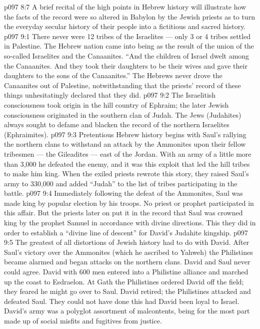\vs p097 8:7 \pc A brief recital of the high points in Hebrew history will illustrate how the facts of the record were so altered in Babylon by the Jewish priests as to turn the everyday secular history of their people into a fictitious and sacred history.
\vs p097 9:1 There never were 12 tribes of the Israelites --- only 3 or 4 tribes settled in Palestine. The Hebrew nation came into being as the result of the union of the so\hyp{}called Israelites and the Canaanites. “And the children of Israel dwelt among the Canaanites. And they took their daughters to be their wives and gave their daughters to the sons of the Canaanites.” The Hebrews never drove the Canaanites out of Palestine, notwithstanding that the priests’ record of these things unhesitatingly declared that they did.
\vs p097 9:2 The Israelitish consciousness took origin in the hill country of Ephraim; the later Jewish consciousness originated in the southern clan of Judah. The Jews (Judahites) always sought to defame and blacken the record of the northern Israelites (Ephraimites).
\vs p097 9:3 \pc Pretentious Hebrew history begins with Saul’s rallying the northern clans to withstand an attack by the Ammonites upon their fellow tribesmen --- the Gileadites --- east of the Jordan. With an army of a little more than 3,000 he defeated the enemy, and it was this exploit that led the hill tribes to make him king. When the exiled priests rewrote this story, they raised Saul’s army to 330,000 and added “Judah” to the list of tribes participating in the battle.
\vs p097 9:4 Immediately following the defeat of the Ammonites, Saul was made king by popular election by his troops. No priest or prophet participated in this affair. But the priests later on put it in the record that Saul was crowned king by the prophet Samuel in accordance with divine directions. This they did in order to establish a “divine line of descent” for David’s Judahite kingship.
\vs p097 9:5 The greatest of all distortions of Jewish history had to do with David. After Saul’s victory over the Ammonites (which he ascribed to Yahweh) the Philistines became alarmed and began attacks on the northern clans. David and Saul never could agree. David with 600 men entered into a Philistine alliance and marched up the coast to Esdraelon. At Gath the Philistines ordered David off the field; they feared he might go over to Saul. David retired; the Philistines attacked and defeated Saul. They could not have done this had David been loyal to Israel. David’s army was a polyglot assortment of malcontents, being for the most part made up of social misfits and fugitives from justice.
